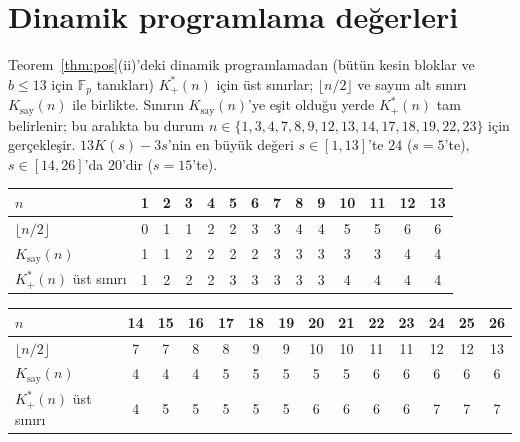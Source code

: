 \documentclass[aps,pra,onecolumn,superscriptaddress,nofootinbib,longbibliography,10pt]{revtex4-2}
\theoremstyle{definition}
\newcommand{\FF}{\mathbb F}
\newcommand{\Kp}{K^{*}_{+}}
\newcommand{\Kc}{K_{\mathrm{say}}}
\begin{document}
\section{Dinamik programlama değerleri}\label{app:dp}
Teorem~\ref{thm:pos}(ii)'deki dinamik programlamadan (bütün kesin bloklar ve $b\le13$ için $\FF_p$ tanıkları) $\Kp(n)$ için üst sınırlar; $\lfloor n/2\rfloor$ ve sayım alt sınırı $\Kc(n)$ ile birlikte. Sınırın $\Kc(n)$'ye eşit olduğu yerde $\Kp(n)$ tam belirlenir; bu aralıkta bu durum $n\in\{1,3,4,7,8,9,12,13,14,17,18,19,22,23\}$ için gerçekleşir. $13K(s)-3s$'nin en büyük değeri $s\in[1,13]$'te $24$ ($s=5$'te), $s\in[14,26]$'da $20$'dir ($s=15$'te).

\begin{center}
\begin{tabular}{lccccccccccccc}
\toprule
$n$ & 1 & 2 & 3 & 4 & 5 & 6 & 7 & 8 & 9 & 10 & 11 & 12 & 13\\
\midrule
$\lfloor n/2\rfloor$ & 0 & 1 & 1 & 2 & 2 & 3 & 3 & 4 & 4 & 5 & 5 & 6 & 6\\
$\Kc(n)$ & 1 & 1 & 2 & 2 & 2 & 2 & 3 & 3 & 3 & 3 & 3 & 4 & 4\\
$\Kp(n)$ üst sınırı & 1 & 2 & 2 & 2 & 3 & 3 & 3 & 3 & 3 & 4 & 4 & 4 & 4\\
\bottomrule
\end{tabular}

\medskip
\begin{tabular}{lccccccccccccc}
\toprule
$n$ & 14 & 15 & 16 & 17 & 18 & 19 & 20 & 21 & 22 & 23 & 24 & 25 & 26\\
\midrule
$\lfloor n/2\rfloor$ & 7 & 7 & 8 & 8 & 9 & 9 & 10 & 10 & 11 & 11 & 12 & 12 & 13\\
$\Kc(n)$ & 4 & 4 & 4 & 5 & 5 & 5 & 5 & 5 & 6 & 6 & 6 & 6 & 6\\
$\Kp(n)$ üst sınırı & 4 & 5 & 5 & 5 & 5 & 5 & 6 & 6 & 6 & 6 & 7 & 7 & 7\\
\bottomrule
\end{tabular}

\medskip
\end{center}
\end{document}
